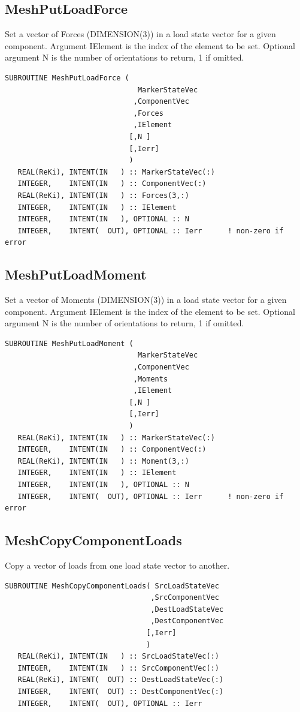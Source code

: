 \documentclass[11pt]{article}
\begin{document}
\subsection{MeshPutLoadForce}
Set a vector of Forces (DIMENSION(3)) in a load state vector for a given component.
Argument IElement is the index of the element to be set.
Optional argument N is the number of orientations to return, 1 if omitted.
\begin{verbatim}
SUBROUTINE MeshPutLoadForce ( 
                               MarkerStateVec
                              ,ComponentVec 
                              ,Forces
                              ,IElement
                             [,N ]
                             [,Ierr]
                             )
   REAL(ReKi), INTENT(IN   ) :: MarkerStateVec(:)
   INTEGER,    INTENT(IN   ) :: ComponentVec(:)
   REAL(ReKi), INTENT(IN   ) :: Forces(3,:)
   INTEGER,    INTENT(IN   ) :: IElement
   INTEGER,    INTENT(IN   ), OPTIONAL :: N
   INTEGER,    INTENT(  OUT), OPTIONAL :: Ierr 		! non-zero if error
\end{verbatim}

\subsection{MeshPutLoadMoment}
Set a vector of Moments (DIMENSION(3)) in a load state vector for a given component.
Argument IElement is the index of the element to be set.
Optional argument N is the number of orientations to return, 1 if omitted.
\begin{verbatim}
SUBROUTINE MeshPutLoadMoment ( 
                               MarkerStateVec
                              ,ComponentVec 
                              ,Moments
                              ,IElement
                             [,N ]
                             [,Ierr]
                             )
   REAL(ReKi), INTENT(IN   ) :: MarkerStateVec(:)
   INTEGER,    INTENT(IN   ) :: ComponentVec(:)
   REAL(ReKi), INTENT(IN   ) :: Moment(3,:)
   INTEGER,    INTENT(IN   ) :: IElement
   INTEGER,    INTENT(IN   ), OPTIONAL :: N
   INTEGER,    INTENT(  OUT), OPTIONAL :: Ierr 		! non-zero if error
\end{verbatim}

\subsection{MeshCopyComponentLoads}
Copy a vector of loads from one load state vector to another.
\begin{verbatim}
SUBROUTINE MeshCopyComponentLoads( SrcLoadStateVec
                                  ,SrcComponentVec
                                  ,DestLoadStateVec
                                  ,DestComponentVec
                                 [,Ierr]
                                 )
   REAL(ReKi), INTENT(IN   ) :: SrcLoadStateVec(:)
   INTEGER,    INTENT(IN   ) :: SrcComponentVec(:)
   REAL(ReKi), INTENT(  OUT) :: DestLoadStateVec(:)
   INTEGER,    INTENT(  OUT) :: DestComponentVec(:)
   INTEGER,    INTENT(  OUT), OPTIONAL :: Ierr
\end{verbatim}
\end{document}
